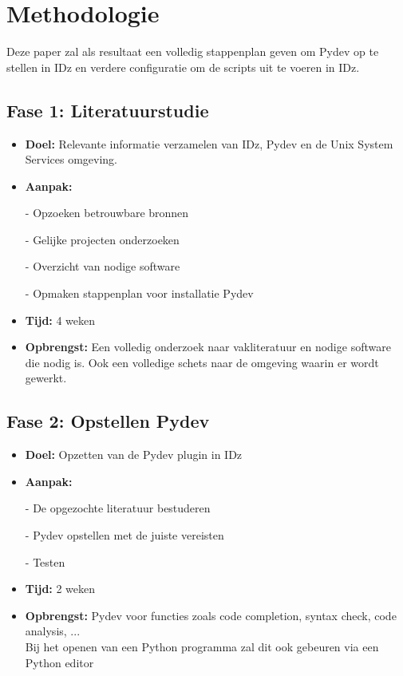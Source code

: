 \section{Methodologie}%
\label{sec:methodologie}
Deze paper zal als resultaat een volledig stappenplan geven om Pydev op te stellen in IDz en verdere configuratie om de scripts uit te voeren in IDz.

\subsection{Fase 1: Literatuurstudie}
\begin{itemize}
    \item \textbf{Doel:}
          Relevante informatie verzamelen van IDz, Pydev en de Unix System Services omgeving.
    \item \textbf{Aanpak:}
            \item[-] Opzoeken betrouwbare bronnen
            \item[-] Gelijke projecten onderzoeken
            \item[-] Overzicht van nodige software
            \item[-] Opmaken stappenplan voor installatie Pydev
     \item \textbf{Tijd:} 4 weken
     \item \textbf{Opbrengst:}
           Een volledig onderzoek naar vakliteratuur en nodige software die nodig is. Ook een volledige schets naar de omgeving waarin er wordt gewerkt.
\end{itemize}


\subsection{Fase 2: Opstellen Pydev}
\begin{itemize}
    \item \textbf{Doel:}
    Opzetten van de Pydev plugin in IDz
    \item \textbf{Aanpak:}
    \item[-] De opgezochte literatuur bestuderen
    \item[-] Pydev opstellen met de juiste vereisten
    \item[-] Testen
    \item \textbf{Tijd:} 2 weken
    \item \textbf{Opbrengst:}
    Pydev voor functies zoals code completion, syntax check, code analysis, ... \\ 
    Bij het openen van een Python programma zal dit ook gebeuren via een Python editor
\end{itemize}


